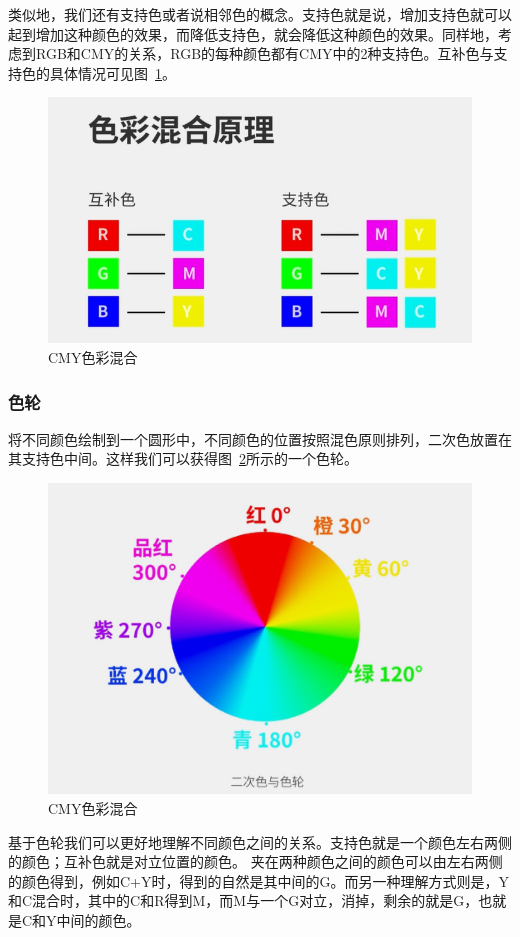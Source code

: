 \documentclass{ctexart}
\begin{document}
类似地，我们还有支持色或者说相邻色的概念。支持色就是说，增加支持色就可以起到增加这种颜色的效果，而降低支持色，就会降低这种颜色的效果。同样地，考虑到RGB和CMY的关系，RGB的每种颜色都有CMY中的2种支持色。互补色与支持色的具体情况可见图~\ref{fig_color_complementary_supporting}。
\begin{figure}[h!]
    \centering
    \includegraphics[width=.8\linewidth]{imgs/color_complementary_supporting.png}
    \caption{CMY色彩混合}
    \label{fig_color_complementary_supporting}
\end{figure}

\subsubsection{色轮}
将不同颜色绘制到一个圆形中，不同颜色的位置按照混色原则排列，二次色放置在其支持色中间。这样我们可以获得图~\ref{color_plate}所示的一个色轮。
\begin{figure}[h!]
    \centering
    \includegraphics[width=.8\linewidth]{imgs/color_plate.png}
    \caption{CMY色彩混合}
    \label{color_plate}
\end{figure}
基于色轮我们可以更好地理解不同颜色之间的关系。支持色就是一个颜色左右两侧的颜色；互补色就是对立位置的颜色。
夹在两种颜色之间的颜色可以由左右两侧的颜色得到，例如C+Y时，得到的自然是其中间的G。而另一种理解方式则是，Y和C混合时，其中的C和R得到M，而M与一个G对立，消掉，剩余的就是G，也就是C和Y中间的颜色。
\end{document}
